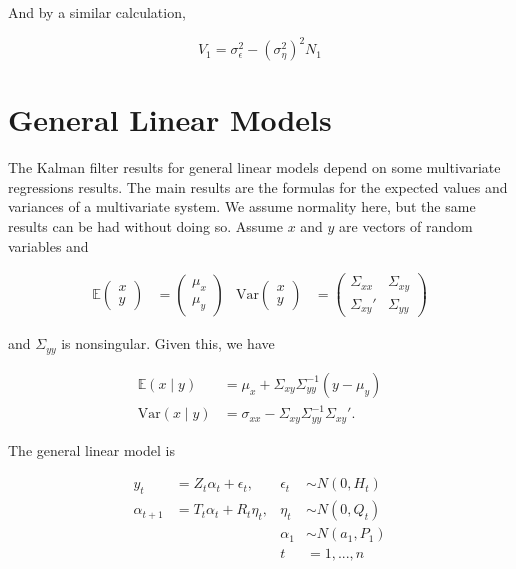 \documentclass{tufte-book}
\begin{document}
\noindent And by a similar calculation, 

\[
V_1 = \sigma_\epsilon^2 - (\sigma_\eta^2)^2 N_1
\]

\section{General Linear Models}

The Kalman filter results for general linear models depend on some multivariate regressions results. The main results are the formulas for the expected values and variances of a multivariate system. We assume normality here, but the same results can be had without doing so. Assume $x$ and $y$ are vectors of random variables and 

\begin{align*}
\mathbb{E}\begin{pmatrix}
x \\
y
\end{pmatrix} &= \begin{pmatrix}
\mu_x \\
\mu_y
\end{pmatrix} & \text{Var}\begin{pmatrix}
x \\
y
\end{pmatrix} &= \begin{pmatrix}
\Sigma_{xx} & \Sigma_{xy} \\
\Sigma_{xy}' & \Sigma_{yy}
\end{pmatrix}
\end{align*}

\noindent and $\Sigma_{yy}$ is nonsingular. Given this, we have

\begin{align*}
\mathbb{E}(x \mid y) &= \mu_x + \Sigma_{xy}\Sigma_{yy}^{-1}(y - \mu_y) \\
\text{Var}(x \mid y) &= \sigma_{xx} - \Sigma_{xy} \Sigma_{yy}^{-1} \Sigma_{xy}'.
\end{align*}

The general linear model is

\begin{align*}
y_t &= Z_t \alpha_t + \epsilon_t, & \epsilon_t &\sim N(0, H_t) \\
\alpha_{t+1} &= T_t \alpha_t + R_t \eta_t, & \eta_t &\sim N(0, Q_t) \\
&& \alpha_1 &\sim N(a_1, P_1) \\
&& t &= 1, ..., n
\end{align*}
\end{document}
